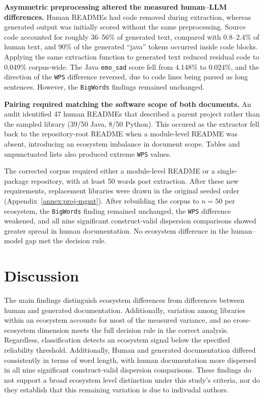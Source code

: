 \documentclass[conference]{IEEEtran}
\begin{document}
\textbf{Asymmetric preprocessing altered the measured human--LLM differences.} Human READMEs had code removed during extraction, whereas generated output was initially scored without the same preprocessing. Source code accounted for roughly 36--56\% of generated text, compared with 0.8--2.4\% of human text, and 90\% of the generated ``java'' tokens occurred inside code blocks. Applying the same extraction function to generated text reduced residual code to 0.049\% corpus-wide. The Java \texttt{emo\_sad} score fell from $4.148\%$ to $0.024\%$, and the direction of the \texttt{WPS} difference reversed, due to code lines being parsed as long sentences. However, the \texttt{BigWords} findings remained unchanged. 

\textbf{Pairing required matching the software scope of both documents.}
\label{sec:readme-scope}
An audit identified 47 human READMEs that described a parent project rather than the sampled library (39/50 Java, 8/50 Python). This occured as the extractor fell back to the repository-root README when a module-level README was absent, introducing an ecosystem imbalance in document scope. Tables and unpunctuated lists also produced extreme \texttt{WPS} values. 

The corrected corpus required either a module-level README or a single-package repository, with at least 50 words post extraction. After these new requirements, replacement libraries were drawn in the original seeded order (Appendix~\ref{annex:proj-mgmt}). After rebuilding the corpus to $n=50$ per ecosystem, the \texttt{BigWords} finding remained unchanged, the \texttt{WPS} difference weakened, and all nine significant construct-valid dispersion comparisons showed greater spread in human documentation. No ecosystem difference in the human--model gap met the decision rule.
\section{Discussion}
\label{sec:results-discussion}

The main findings distinguish ecosystem differences from differences between human and generated documentation. Additionally, variation among libraries within an ecosystem accounts for most of the measured variance, and no cross-ecosystem dimension meets the full decision rule in the correct analysis. Regardless, classification detects an ecosystem signal below the specified reliability threshold. Additionally, Human and generated documentation differed consistently in terms of word length, with human documentation more dispersed in all nine significant construct-valid dispersion comparisons. These findings do not support a broad ecosystem level distinction under this study's criteria, nor do they establish that this remaining variation is due to indivudal authors.
\end{document}
